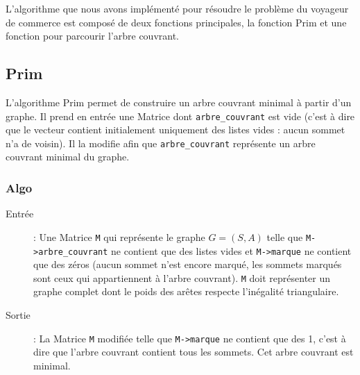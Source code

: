 \documentclass[a4paper,11pt]{article}
\begin{document}
L'algorithme que nous avons implémenté pour résoudre le problème du voyageur de commerce est composé de deux fonctions principales, la fonction Prim et une fonction pour parcourir l'arbre couvrant.

\subsection{Prim} %

L'algorithme Prim permet de construire un arbre couvrant minimal à partir d'un graphe. Il prend en entrée une \textsf{Matrice} dont \texttt{arbre\_couvrant} est vide (c'est à dire que le vecteur contient initialement uniquement des listes vides : aucun sommet n'a de voisin). Il la modifie afin que \texttt{arbre\_couvrant} représente un arbre couvrant minimal du graphe.

\subsubsection*{Algo}
\begin{description}
\item[Entrée] : Une Matrice \texttt{M} qui représente le graphe $G = (S, A)$ telle que \texttt{M->arbre\_couvrant} ne contient que des listes vides et \texttt{M->marque} ne contient que des zéros (aucun sommet n'est encore marqué, les sommets marqués sont ceux qui appartiennent à l'arbre couvrant). \texttt{M} doit représenter un graphe complet dont le poids des arêtes respecte l'inégalité triangulaire.
\item[Sortie] : La Matrice \texttt{M} modifiée telle que \texttt{M->marque} ne contient que des 1, c'est à dire que l'arbre couvrant contient tous les sommets. Cet arbre couvrant est minimal.
\end{description}
\end{document}
